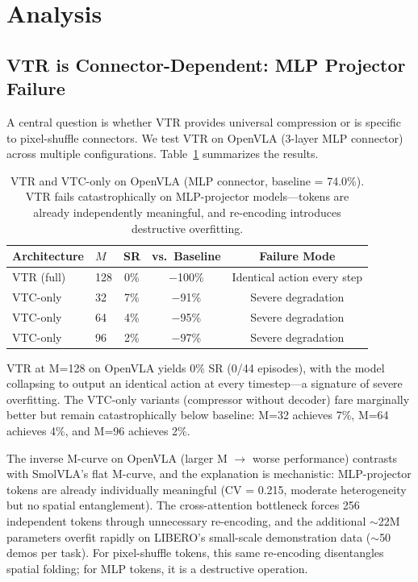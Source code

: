 \documentclass[letterpaper]{article}
\begin{document}
\section{Analysis}

\subsection{VTR is Connector-Dependent: MLP Projector Failure}

A central question is whether VTR provides universal compression or is specific to pixel-shuffle connectors. We test VTR on OpenVLA (3-layer MLP connector) across multiple configurations. Table~\ref{tab:vtr_openvla} summarizes the results.

\begin{table}[t]
\centering
\caption{VTR and VTC-only on OpenVLA (MLP connector, baseline = 74.0\%). VTR fails catastrophically on MLP-projector models---tokens are already independently meaningful, and re-encoding introduces destructive overfitting.}
\label{tab:vtr_openvla}
\small
\begin{tabular}{@{}llccc@{}}
\toprule
\textbf{Architecture} & $M$ & \textbf{SR} & \textbf{vs.\ Baseline} & \textbf{Failure Mode} \\
\midrule
VTR (full) & 128 & 0\% & $-$100\% & Identical action every step \\
VTC-only   & 32  & 7\% & $-$91\%  & Severe degradation \\
VTC-only   & 64  & 4\% & $-$95\%  & Severe degradation \\
VTC-only   & 96  & 2\% & $-$97\%  & Severe degradation \\
\bottomrule
\end{tabular}
\end{table}

VTR at M=128 on OpenVLA yields 0\% SR (0/44 episodes), with the model collapsing to output an identical action at every timestep---a signature of severe overfitting. The VTC-only variants (compressor without decoder) fare marginally better but remain catastrophically below baseline: M=32 achieves 7\%, M=64 achieves 4\%, and M=96 achieves 2\%.

The inverse M-curve on OpenVLA (larger M $\to$ worse performance) contrasts with SmolVLA's flat M-curve, and the explanation is mechanistic: MLP-projector tokens are already individually meaningful (CV = 0.215, moderate heterogeneity but no spatial entanglement). The cross-attention bottleneck forces 256 independent tokens through unnecessary re-encoding, and the additional $\sim$22M parameters overfit rapidly on LIBERO's small-scale demonstration data ($\sim$50 demos per task). For pixel-shuffle tokens, this same re-encoding disentangles spatial folding; for MLP tokens, it is a destructive operation.
\end{document}
